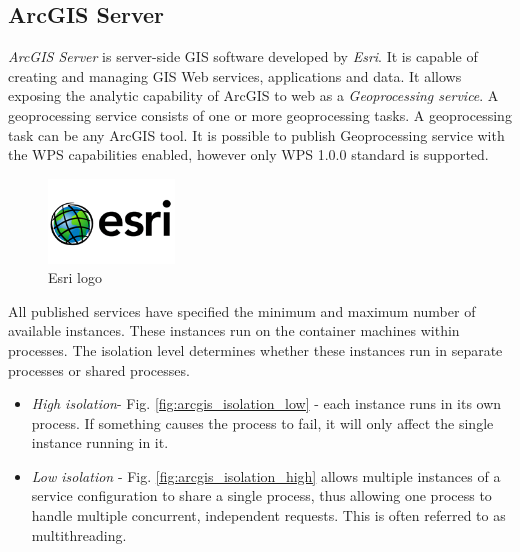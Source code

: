 \subsection{ArcGIS Server}
\textit{ArcGIS Server} is server-side GIS software developed by
\textit{Esri}. It is capable of creating and managing GIS Web
services, applications and data. It allows exposing the analytic
capability of ArcGIS to web as a \textit{Geoprocessing service}. A
geoprocessing service consists of one or more geoprocessing tasks. 
A geoprocessing task can be any ArcGIS tool. It is possible to
publish Geoprocessing service with the WPS capabilities enabled,
however only WPS 1.0.0 standard is supported.

\begin{figure}[h!]
\centering
\includegraphics[width=0.3\textwidth]{img/Intro_esri.png}
\caption{Esri logo}
\label{fig:geoserver_status}
\end{figure}

All published services have specified the minimum and maximum number of available instances. These instances run on the container machines within processes. The isolation level determines whether these instances run in separate processes or shared processes. 
\begin{itemize}
\item \textit{High isolation}- Fig. \ref{fig:arcgis_isolation_low} - each instance runs in its own process. If something causes the process to fail, it will only affect the single instance running in it.
\item \textit{Low isolation} - Fig. \ref{fig:arcgis_isolation_high} allows multiple instances of a service configuration to share a single process, thus allowing one process to handle multiple concurrent, independent requests. This is often referred to as multithreading.
\end{itemize} 

